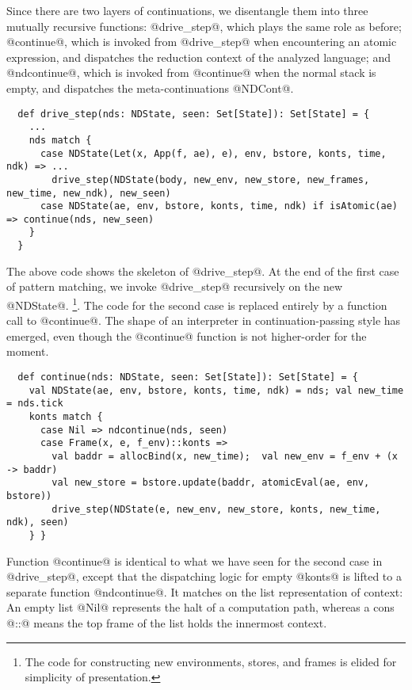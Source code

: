 \documentclass[acmsmall, review]{acmart}\settopmatter{}
\begin{document}
Since there are two layers of continuations, we disentangle them into three mutually recursive 
functions:
@drive_step@, which plays the same role as before; 
@continue@, which is invoked from @drive_step@ when encountering an atomic expression, 
  and dispatches the reduction context of the analyzed language; and 
@ndcontinue@, which is invoked from @continue@ when the normal stack is empty,
  and dispatches the meta-continuations @NDCont@.

\begin{lstlisting}
  def drive_step(nds: NDState, seen: Set[State]): Set[State] = {
    ... 
    nds match {
      case NDState(Let(x, App(f, ae), e), env, bstore, konts, time, ndk) => ...
        drive_step(NDState(body, new_env, new_store, new_frames, new_time, new_ndk), new_seen)
      case NDState(ae, env, bstore, konts, time, ndk) if isAtomic(ae) => continue(nds, new_seen)
    }
  }
\end{lstlisting}

The above code shows the skeleton of @drive_step@.
At the end of the first case of pattern matching, we invoke @drive_step@ recursively 
on the new @NDState@.
\footnote{The code for constructing new environments, stores, and frames is elided for 
simplicity of presentation.}.
The code for the second case is replaced entirely by a function call to @continue@.
The shape of an interpreter in continuation-passing style has emerged, even though
the @continue@ function is not higher-order for the moment.

\begin{lstlisting}
  def continue(nds: NDState, seen: Set[State]): Set[State] = {
    val NDState(ae, env, bstore, konts, time, ndk) = nds; val new_time = nds.tick
    konts match {
      case Nil => ndcontinue(nds, seen)
      case Frame(x, e, f_env)::konts =>
        val baddr = allocBind(x, new_time);  val new_env = f_env + (x -> baddr)
        val new_store = bstore.update(baddr, atomicEval(ae, env, bstore))
        drive_step(NDState(e, new_env, new_store, konts, new_time, ndk), seen)
    } }
\end{lstlisting}

Function @continue@ is identical to what we have seen for the second case in @drive_step@,
except that the dispatching logic for empty @konts@ is lifted to a separate function 
@ndcontinue@.
It matches on the list representation of context: An empty list @Nil@ represents the
halt of a computation path, whereas a cons @::@ means the top frame of the list
holds the innermost context.
\end{document}
